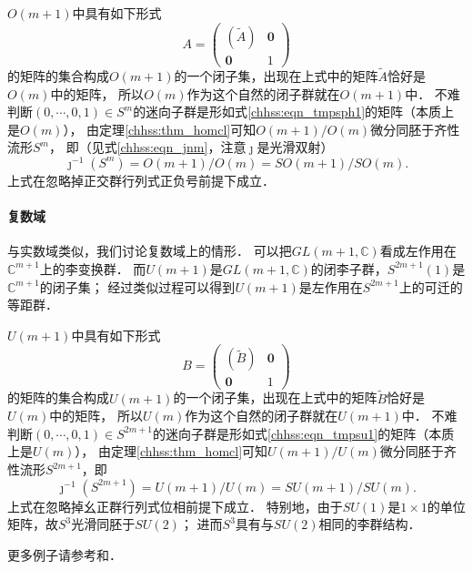 $O(m+1)$中具有如下形式
\begin{equation}\label{chhss:eqn_tmpsph1}
    A=\begin{pmatrix}
        (\tilde{A}) & \boldsymbol{0} \\ \boldsymbol{0} & 1
    \end{pmatrix}
\end{equation}
的矩阵的集合构成$O(m+1)$的一个闭子集，出现在上式中的矩阵$\tilde{A}$恰好是$O(m)$中的矩阵，
所以$O(m)$作为这个自然的闭子群就在$O(m+1)$中．
不难判断$(0,\cdots,0,1)\in S^m$的迷向子群是形如式\eqref{chhss:eqn_tmpsph1}的矩阵（本质上是$O(m)$），
由定理\ref{chhss:thm_homcl}可知$O(m+1)/O(m)$微分同胚于齐性流形$S^m$，
即（见式\eqref{chhss:eqn_jnm}，注意$\jmath$是光滑双射）
\begin{equation}
    \jmath^{-1} (S^m)=O(m+1)/O(m)=SO(m+1)/SO(m).
\end{equation}
上式在忽略掉正交群行列式正负号前提下成立．


\paragraph{复数域}
与实数域类似，我们讨论复数域上的情形．
可以把$GL(m+1,\mathbb{C})$看成左作用在$\mathbb{C}^{m+1}$上的李变换群．
而$U(m+1)$是$GL(m+1,\mathbb{C})$的闭李子群，$S^{2m+1}(1)$是$\mathbb{C}^{m+1}$的闭子集；
经过类似过程可以得到$U(m+1)$是左作用在$S^{2m+1}$上的可迁的等距群．

$U(m+1)$中具有如下形式
\begin{equation}\label{chhss:eqn_tmpsu1}
    B=\begin{pmatrix}
        (\tilde{B}) & \boldsymbol{0} \\ \boldsymbol{0} & 1
    \end{pmatrix}
\end{equation}
的矩阵的集合构成$U(m+1)$的一个闭子集，出现在上式中的矩阵$\tilde{B}$恰好是$U(m)$中的矩阵，
所以$U(m)$作为这个自然的闭子群就在$U(m+1)$中．
不难判断$(0,\cdots,0,1)\in S^{2m+1}$的迷向子群是形如式\eqref{chhss:eqn_tmpsu1}的矩阵（本质上是$U(m)$），
由定理\ref{chhss:thm_homcl}可知$U(m+1)/U(m)$微分同胚于齐性流形$S^{2m+1}$，即
\begin{equation}
    \jmath^{-1} (S^{2m+1})=U(m+1)/U(m)=SU(m+1)/SU(m).
\end{equation}
上式在忽略掉幺正群行列式位相前提下成立．
特别地，由于$SU(1)$是$1\times 1$的单位矩阵，故$S^3$光滑同胚于$SU(2)$；
进而$S^3$具有与$SU(2)$相同的李群结构．



更多例子请参考\parencite[\S 11.14-11.20]{oneill1983}和\parencite[3.65]{warner-1983-FDMLG}．






